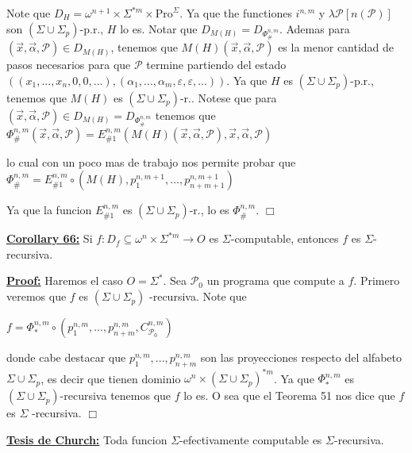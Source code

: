 Note que \(D_{H}=\omega ^{n+1}\times \Sigma ^{\ast m}\times \mathrm{Pro} ^{\Sigma }\). Ya que the functiones \(i^{n,m}\) y \(\lambda \mathcal{P}\left[ n( \mathcal{P})\right] \) son \((\Sigma \cup \Sigma _{p})\)-p.r., \(H\) lo es. Notar que \(D_{M(H)}=D_{\Phi _{\#}^{n,m}}\). Ademas para \((\vec{x},\vec{\alpha}, \mathcal{P})\in D_{M(H)}\), tenemos que \(M(H)(\vec{x},\vec{\alpha},\mathcal{P} )\) es la menor cantidad de pasos necesarios para que \(\mathcal{P}\) termine partiendo del estado \(((x_{1},...,x_{n},0,0,...),(\alpha _{1},...,\alpha _{m},\varepsilon ,\varepsilon ,...))\). Ya que \(H\) es \((\Sigma \cup \Sigma _{p})\)-p.r., tenemos que \(M(H)\) es \((\Sigma \cup \Sigma _{p})\)-r.. Notese que para \((\vec{x},\vec{\alpha},\mathcal{P})\in D_{M(H)}=D_{\Phi _{\#}^{n,m}} \) tenemos que
\(\displaystyle \Phi _{\#}^{n,m}(\vec{x},\vec{\alpha},\mathcal{P})=E_{\#1}^{n,m}\left( M(H)( \vec{x},\vec{\alpha},\mathcal{P}),\vec{x},\vec{\alpha},\mathcal{P}\right) \)

lo cual con un poco mas de trabajo nos permite probar que
\(\displaystyle \Phi _{\#}^{n,m}=E_{\#1}^{n,m}\circ \left( M(H),p_{1}^{n,m+1},...,p_{n+m+1}^{n,m+1}\right) \)

Ya que la funcion \(E_{\#1}^{n,m}\) es \((\Sigma \cup \Sigma _{p})\)-r., lo es \( \Phi _{\#}^{n,m}\). \(\Box\)



\textbf{\underline{Corollary 66:}} Si \(f:D_{f}\subseteq \omega ^{n}\times \Sigma ^{\ast m}\rightarrow O\) es \( \Sigma \)-computable, entonces \(f\) es \(\Sigma \)-recursiva.

\textbf{\underline{Proof:}} Haremos el caso \(O=\Sigma ^{\ast }\). Sea \(\mathcal{P}_{0}\) un programa que compute a \(f\). Primero veremos que \(f\) es \((\Sigma \cup \Sigma _{p})\) -recursiva. Note que

\(\displaystyle f=\Phi _{\ast }^{n,m}\circ \left( p_{1}^{n,m},...,p_{n+m}^{n,m},C_{\mathcal{P }_{0}}^{n,m}\right) \)

donde cabe destacar que \(p_{1}^{n,m},...,p_{n+m}^{n,m}\) son las proyecciones respecto del alfabeto \(\Sigma \cup \Sigma _{p}\), es decir que tienen dominio \(\omega ^{n}\times (\Sigma \cup \Sigma _{p})^{\ast m}\). Ya que \(\Phi _{\ast }^{n,m}\) es \((\Sigma \cup \Sigma _{p})\)-recursiva tenemos que \(f\) lo es. O sea que el Teorema 51 nos dice que \(f\) es \(\Sigma \) -recursiva. \(\Box\)


\textbf{\underline{Tesis de Church:}} Toda funcion \(\Sigma \)-efectivamente computable es \(\Sigma \)-recursiva.



